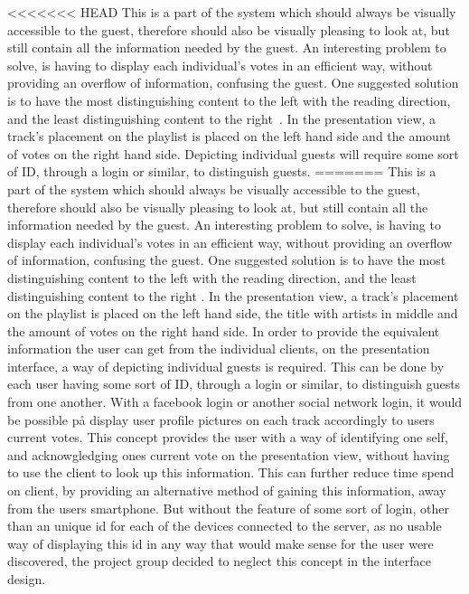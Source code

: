<<<<<<< HEAD
This is a part of the system which should always be visually accessible to the guest, therefore should also be visually pleasing to look at, but still contain all the information needed by the guest. An interesting problem to solve, is having to display each individual's votes in an efficient way, without providing an overflow of information, confusing the guest. One suggested solution is to have the most distinguishing content to the left with the reading direction, and the least distinguishing content to the right~\cite{material}. In the presentation view, a track's placement on the playlist is placed on the left hand side and the amount of votes on the right hand side. Depicting individual guests will require some sort of ID, through a login or similar, to distinguish guests.
=======
This is a part of the system which should always be visually accessible to the guest, therefore should also be visually pleasing to look at, but still contain all the information needed by the guest. An interesting problem to solve, is having to display each individual's votes in an efficient way, without providing an overflow of information, confusing the guest. One suggested solution is to have the most distinguishing content to the left with the reading direction, and the least distinguishing content to the right \cite{material}. In the presentation view, a track's placement on the playlist is placed on the left hand side, the title with artists in middle and the amount of votes on the right hand side. In order to provide the equivalent information the user can get from the individual clients, on the presentation interface, a way of depicting individual guests is required. This can be done by each user having some sort of ID, through a login or similar, to distinguish guests from one another. With a facebook login or another social network login, it would be possible på display user profile pictures on each track accordingly to users current votes. This concept provides the user with a way of identifying one self, and acknowgledging ones current vote on the presentation view, without having to use the client to look up this information. This can further reduce time spend on client, by providing an alternative method of gaining this information, away from the users smartphone. But without the feature of some sort of login, other than an unique id for each of the devices connected to the server, as no usable way of displaying this id in any way that would make sense for the user were discovered, the project group decided to neglect this concept in the interface design.

